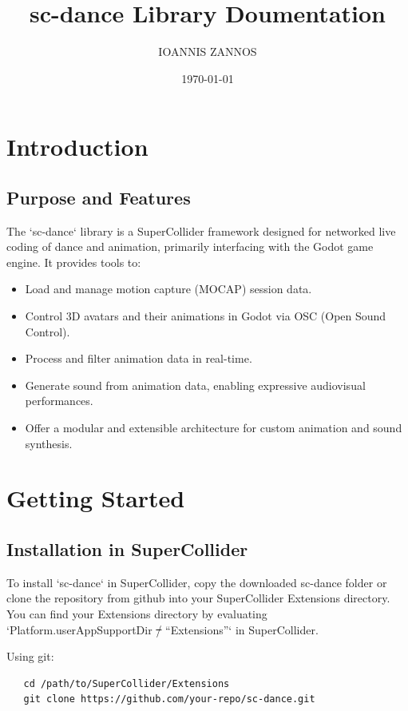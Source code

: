 \documentclass[11pt]{article}
\author{IOANNIS ZANNOS}
\date{\today}
\title{sc-dance Library Doumentation}
\begin{document}
\maketitle
\tableofcontents

\section{Introduction}
\label{sec:org33cc909}
\subsection{Purpose and Features}
\label{sec:orga9f44cd}

The `sc-dance` library is a SuperCollider framework designed for networked live coding of dance and animation, primarily interfacing with the Godot game engine. It provides tools to:

\begin{itemize}
\item Load and manage motion capture (MOCAP) session data.
\item Control 3D avatars and their animations in Godot via OSC (Open Sound Control).
\item Process and filter animation data in real-time.
\item Generate sound from animation data, enabling expressive audiovisual performances.
\item Offer a modular and extensible architecture for custom animation and sound synthesis.
\end{itemize}
\section{Getting Started}
\label{sec:orgd898235}
\subsection{Installation in SuperCollider}
\label{sec:org5ad7ab5}

To install `sc-dance` in SuperCollider, copy the downloaded sc-dance folder or clone the repository from github into your SuperCollider Extensions directory. You can find your Extensions directory by evaluating `Platform.userAppSupportDir \sout{/} ``Extensions''` in SuperCollider.

Using git:
\begin{verbatim}
   cd /path/to/SuperCollider/Extensions
   git clone https://github.com/your-repo/sc-dance.git
\end{verbatim}
\end{document}
